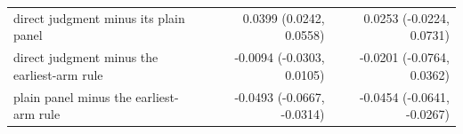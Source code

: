 \begin{tabular}{p{6.6cm}rr}
\quad direct judgment minus its plain panel & 0.0399 (0.0242, 0.0558) & 0.0253 (-0.0224, 0.0731) \\
\quad direct judgment minus the earliest-arm rule & -0.0094 (-0.0303, 0.0105) & -0.0201 (-0.0764, 0.0362) \\
\quad plain panel minus the earliest-arm rule & -0.0493 (-0.0667, -0.0314) & -0.0454 (-0.0641, -0.0267) \\

\end{tabular}
